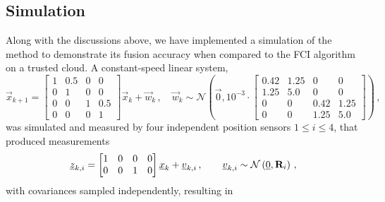 \subsection{Simulation}\label{subsec:cloud_fusion:secfci_simulation}
Along with the discussions above, we have implemented a simulation of the method to demonstrate its fusion accuracy when compared to the FCI algorithm on a trusted cloud. A constant-speed linear system, 
\begin{equation}\label{eq:cloud_fusion:secfci_system_model}
    \vec{x}_{k+1} = 
    \begin{bmatrix}
        1 & 0.5 & 0 & 0\\
        0 & 1 & 0 & 0\\
        0 & 0 & 1 & 0.5\\
        0 & 0 & 0 & 1
    \end{bmatrix}\vec{x}_k + \vec{w}_k\,,\quad \vec{w}_k\sim\mathcal{N}\left(\vec{0},10^{-3}\cdot
    \begin{bmatrix}
        0.42 & 1.25 & 0 & 0\\
        1.25 & 5.0 & 0 & 0\\
        0 & 0 & 0.42 & 1.25\\
        0 & 0 & 1.25 & 5.0
    \end{bmatrix}
    \right)\,,
\end{equation}
was simulated and measured by four independent position sensors $1\leq i\leq 4$, that produced measurements 
\begin{equation}\label{eq:cloud_fusion:secfci_measurement_model}
    {\underline{z}}_{k,i} = 
    \begin{bmatrix}
        1 & 0 & 0 & 0\\
        0 & 0 & 1 & 0
     \end{bmatrix}{\underline{x}}_k + {\underline{v}}_{k,i}\,,\qquad {\underline{v}}_{k,i}\sim\mathcal{N}\left({\underline{0}},{{\mathbf{R}}}_i\right)\,,
\end{equation}
with covariances sampled independently, resulting in
